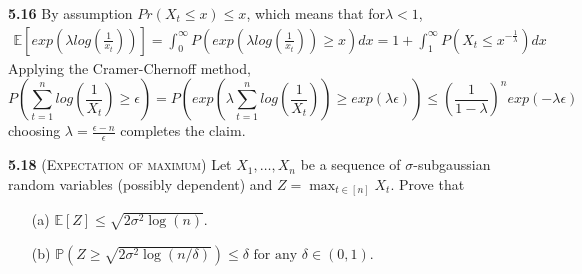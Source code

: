 











\noindent \textbf{5.16}
By assumption $Pr(X_t\leq x)\leq x$, which means that for$\lambda <1$,
\begin{align}
\mathbb{E}\left[exp(\lambda log(\frac{1}{x_t}))\right] = \int_0^\infty P(exp(\lambda log(\frac{1}{x_t}))\geq x)dx = 1 +\int_1^\infty P(X_t \leq x^{-\frac{1}{\lambda}})dx
\end{align}
Applying the Cramer-Chernoff method,
$$P\left(\sum_{t=1}^n log(\frac{1}{X_t}) \geq \epsilon\right) = P\left(exp(\lambda \sum_{t=1}^n log(\frac{1}{X_t})) \geq exp(\lambda \epsilon) \right) \leq \left(\frac{1}{1-\lambda}\right)^n exp (-\lambda \epsilon)$$
choosing $\lambda  = \frac{\epsilon-n}{\epsilon}$ completes the claim.



\noindent \textbf{5.18} (\textsc{Expectation of maximum})
Let $X_{1}, \ldots, X_{n}$ be a sequence of $\sigma$-subgaussian random variables
(possibly dependent) and $Z=\max _{t \in[n]} X_{t}$. Prove that

\begin{itemize}
	\item[(a)] $\mathbb{E}[Z] \leq \sqrt{2 \sigma^{2} \log (n)}$.
	\item[(b)] $\mathbb{P}\left(Z \geq \sqrt{2 \sigma^{2} \log (n / \delta)}\right) \leq \delta \text { for any } \delta \in(0,1)$.
\end{itemize}

